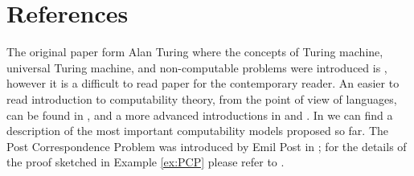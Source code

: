 



%
%

\section*{References}

The original paper form Alan Turing where the concepts of Turing machine, universal Turing machine, and non-computable problems were introduced is \cite{turing1936computable}, however it is a difficult to read paper for the contemporary reader. An easier to read introduction to computability theory, from the point of view of languages, can be found in \cite{sipser2012introduction}, and a more advanced introductions in \cite{cooper2003computability} and \cite{soare2016turing}. In \cite{fernandez2009models} we can find a description of the most important computability models proposed so far. The Post Correspondence Problem was introduced by Emil Post in \cite{post1946variant}; for the details of the proof sketched in Example \ref{ex:PCP} please refer to \cite{sipser2012introduction}.

